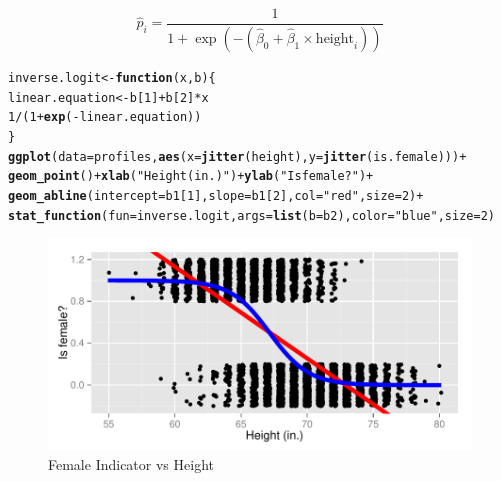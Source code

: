 \documentclass{article}\usepackage[]{graphicx}\usepackage[]{color}
\makeatletter
\def\maxwidth{ %
  \ifdim\Gin@nat@width>\linewidth
    \linewidth
  \else
    \Gin@nat@width
  \fi
}
\newcommand{\hlnum}[1]{\textcolor[rgb]{0.686,0.059,0.569}{#1}}%
\newcommand{\hlstr}[1]{\textcolor[rgb]{0.192,0.494,0.8}{#1}}%
\newcommand{\hlopt}[1]{\textcolor[rgb]{0,0,0}{#1}}%
\newcommand{\hlstd}[1]{\textcolor[rgb]{0.345,0.345,0.345}{#1}}%
\newcommand{\hlkwa}[1]{\textcolor[rgb]{0.161,0.373,0.58}{\textbf{#1}}}%
\newcommand{\hlkwb}[1]{\textcolor[rgb]{0.69,0.353,0.396}{#1}}%
\newcommand{\hlkwc}[1]{\textcolor[rgb]{0.333,0.667,0.333}{#1}}%
\newcommand{\hlkwd}[1]{\textcolor[rgb]{0.737,0.353,0.396}{\textbf{#1}}}%
\newenvironment{kframe}{%
 \def\at@end@of@kframe{}%
 \ifinner\ifhmode%
  \def\at@end@of@kframe{\end{minipage}}%
  \begin{minipage}{\columnwidth}%
 \fi\fi%
 \def\FrameCommand##1{\hskip\@totalleftmargin \hskip-\fboxsep
 \colorbox{shadecolor}{##1}\hskip-\fboxsep
     \hskip-\linewidth \hskip-\@totalleftmargin \hskip\columnwidth}%
 \MakeFramed {\advance\hsize-\width
   \@totalleftmargin\z@ \linewidth\hsize
   \@setminipage}}%
 {\par\unskip\endMakeFramed%
 \at@end@of@kframe}
\newenvironment{knitrout}{}{} %
\makeatother
\begin{document}
\[
\widehat{p}_i = \frac{1}{1+\exp\left(-(\widehat{\beta}_0 + \widehat{\beta}_1 \times \mbox{height}_i)\right)}
\]


\begin{knitrout}
\color{fgcolor}\begin{kframe}
\begin{alltt}
\hlstd{inverse.logit} \hlkwb{<-} \hlkwa{function}\hlstd{(}\hlkwc{x}\hlstd{,} \hlkwc{b}\hlstd{)\{}
  \hlstd{linear.equation} \hlkwb{<-} \hlstd{b[}\hlnum{1}\hlstd{]} \hlopt{+} \hlstd{b[}\hlnum{2}\hlstd{]}\hlopt{*}\hlstd{x}
  \hlnum{1}\hlopt{/}\hlstd{(}\hlnum{1}\hlopt{+}\hlkwd{exp}\hlstd{(}\hlopt{-}\hlstd{linear.equation))}
\hlstd{\}}
\hlkwd{ggplot}\hlstd{(}\hlkwc{data}\hlstd{=profiles,} \hlkwd{aes}\hlstd{(}\hlkwc{x}\hlstd{=}\hlkwd{jitter}\hlstd{(height),} \hlkwc{y}\hlstd{=}\hlkwd{jitter}\hlstd{(is.female)))} \hlopt{+}
  \hlkwd{geom_point}\hlstd{()} \hlopt{+} \hlkwd{xlab}\hlstd{(}\hlstr{"Height (in.)"}\hlstd{)} \hlopt{+} \hlkwd{ylab}\hlstd{(}\hlstr{"Is female?"}\hlstd{)} \hlopt{+}
  \hlkwd{geom_abline}\hlstd{(}\hlkwc{intercept}\hlstd{=b1[}\hlnum{1}\hlstd{],} \hlkwc{slope}\hlstd{=b1[}\hlnum{2}\hlstd{],} \hlkwc{col}\hlstd{=}\hlstr{"red"}\hlstd{,} \hlkwc{size}\hlstd{=}\hlnum{2}\hlstd{)} \hlopt{+}
  \hlkwd{stat_function}\hlstd{(}\hlkwc{fun} \hlstd{= inverse.logit,} \hlkwc{args}\hlstd{=}\hlkwd{list}\hlstd{(}\hlkwc{b}\hlstd{=b2),} \hlkwc{color}\hlstd{=}\hlstr{"blue"}\hlstd{,} \hlkwc{size}\hlstd{=}\hlnum{2}\hlstd{)}
\end{alltt}
\end{kframe}\begin{figure}

{\centering \includegraphics[width=\maxwidth]{figure/is_female_vs_height_3-1} 

}

\caption[Female Indicator vs Height]{Female Indicator vs Height}\label{fig:is_female_vs_height_3}
\end{figure}


\end{knitrout}
\end{document}
